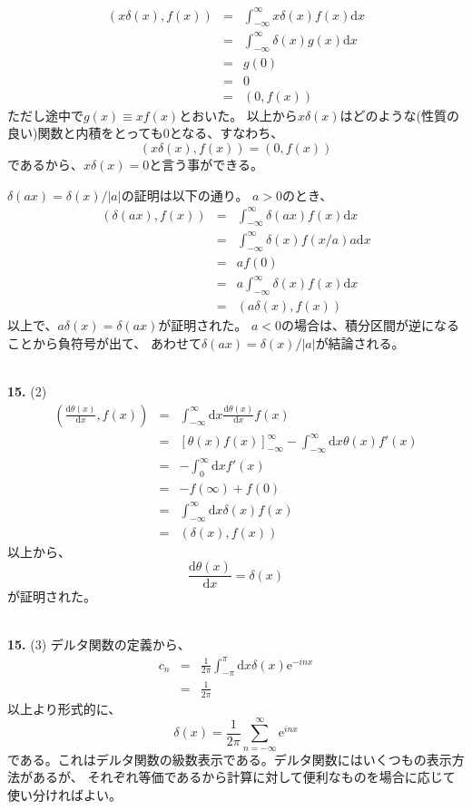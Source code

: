 \documentclass{jarticle}
\newcommand{\diff}{\mathrm d}
\newcommand{\ans}[2]{\noindent\\ {\bf \large #1.} (#2)}
\newcommand{\e}{\mathrm e}
\begin{document}
\begin{eqnarray}
  (x \delta(x), f(x) ) &= &\int_{-\infty}^\infty \!\!\! x \delta(x) f(x) \diff x \\
  &=& \int_{-\infty}^\infty \!\!\! \delta(x) g(x) \diff x \\
  &=& g(0) \\
  &=& 0 \\
  &=& (0, f(x))
\end{eqnarray}
ただし途中で$g(x) \equiv x f(x)$とおいた。
以上から$ x \delta(x)$はどのような(性質の良い)関数と内積をとっても$0$となる、すなわち、
\begin{equation}
  (x \delta(x), f(x)) = (0, f(x))
\end{equation}
であるから、$x \delta(x) = 0$と言う事ができる。

$ \delta(ax) = \delta(x)/|a|$の証明は以下の通り。
$a > 0 $のとき、
\begin{eqnarray}
  (\delta(ax),f(x)) &=& \int_{-\infty}^\infty \!\!\! \delta(ax) f(x) \diff x \\
  &=& \int_{-\infty}^\infty \!\!\! \delta(x) f(x/a) a \diff x\\
  &=& a f(0) \\
  &=& a \int_{-\infty}^\infty \!\!\! \delta(x) f(x) \diff x\\
  &=& (a \delta(x), f(x))
\end{eqnarray}
以上で、$a\delta(x) = \delta(ax)$が証明された。
$a<0$の場合は、積分区間が逆になることから負符号が出て、
あわせて$ \delta(ax) = \delta(x)/|a|$が結論される。

\ans{15}{2}
\begin{eqnarray}
  \left(  \frac{\diff \theta(x)}{\diff x} ,f(x) \right)
  &=& \int_{-\infty}^\infty \!\!\! \diff x \frac{\diff \theta(x)}{\diff x} f(x) \\
  &=&
  \left[
    \theta(x) f(x)
    \right]_{-\infty}^{\infty}
  - \int_{-\infty}^\infty \!\!\! \diff x \theta(x) f'(x)\\
  &=& - \int_{0}^\infty \!\!\! \diff xf'(x)\\
  &=& - f(\infty) + f(0)\\
  &=& \int_{-\infty}^\infty \!\!\! \diff x \delta(x) f(x)\\
  &=& (\delta(x), f(x))
\end{eqnarray}
以上から、
$$
  \displaystyle\frac{\diff \theta(x)}{\diff x} = \delta(x)
$$
が証明された。

\ans{15}{3}
デルタ関数の定義から、
\begin{eqnarray}
  c_n &=& \frac{1}{2\pi} \int_{-\pi}^{\pi} \!\!\! \diff x \delta(x) \e^{-inx} \\
  &=& \frac{1}{2\pi}
\end{eqnarray}
以上より形式的に、
\begin{equation}
  \delta(x) = \frac{1}{2\pi} \sum_{n=-\infty}^{\infty} \e^{inx}
\end{equation}
である。これはデルタ関数の級数表示である。デルタ関数にはいくつもの表示方法があるが、
それぞれ等価であるから計算に対して便利なものを場合に応じて使い分ければよい。
\end{document}
